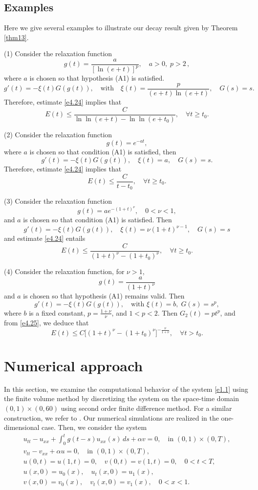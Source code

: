 \documentclass[reqno]{amsart}
\begin{document}
\subsection*{Examples}
Here we give several examples to illustrate our decay result given by Theorem \ref{thm13}.

(1)  Consider the relaxation function
\[
 g(t) = \frac{a}{[\ln(e+t)]^{p}},\quad a>0,\;p>2\, ,
\]
where $a$ is chosen so that hypothesis (A1) is satisfied.
\[
 g'(t) = -\xi(t) G(g(t)), \quad \text{with}\quad
\xi(t)=\frac{p}{(e+t)\ln(e+t)},\quad G(s) = s.
\]
Therefore, estimate \eqref{e4.24} implies that
\[
 E(t) \leq \frac{C}{\ln\ln(e+t)-\ln\ln(e+t_0)}, \quad \forall  t \geq t_0.
\]

(2) Consider the relaxation function
 \[
 g(t) = e^{-a t},
 \]
where $a$ is chosen so that condition (A1) is satisfied, then
 \[
 g'(t) = -\xi(t) G(g(t)), \quad \xi(t) = a, \quad G(s) = s.
 \]
Therefore, estimate \eqref{e4.24} implies that
\[
 E(t) \leq \frac{C}{t-t_0}, \quad \forall  t \geq t_0.
\]

(3) Consider the relaxation function
\[
 g(t) = a e^{-(1+t)^{\nu}}, \quad 0 < \nu < 1,
\]
and $a$ is chosen so that condition (A1) is satisfied. Then
 \[
 g'(t) = -\xi(t) G(g(t)), \quad \xi(t) = \nu(1+t)^{\nu - 1}, \quad G(s) = s
 \]
and estimate \eqref{e4.24} entails
\[
 E(t) \leq \frac{C}{(1+t)^\nu - (1+t_0)^\nu}, \quad \forall  t \geq t_0.
\]


(4) Consider the relaxation function, for $\nu > 1$,
\[
 g(t) = \frac{a}{(1+t)^{\nu}}
\]
and $a$ is chosen so that hypothesis (A1) remains valid. Then
\[
 g'(t)= -\xi(t) G(g(t)), \quad \text{with } \xi(t)=b,\; G(s) = s^{p},
\]
where $b$ is a fixed constant, $p = \frac{1+\nu}{\nu}$, and $1 < p < 2$.
Then $G_2(t) = p  t^p$, and from \eqref{e4.25}, we deduce that
\[
 E(t) \leq C \Big[(1+t)^{\nu}-(1+t_0)^{\nu}\Big]^{-\frac{\nu}{1+\nu}},
\quad \forall t > t_0.
 \]


\section{Numerical approach}

In this section, we examine the computational behavior of the system \eqref{e1.1}
using the finite volume method by discretizing the system on the space-time domain
$(0, 1) \times (0,60)$ using second order finite difference method. For a similar
construction, we refer to \cite{MessaoudiMostafa, GASM}.
Our numerical simulations are realized in the one-dimensional case.
Then, we consider the system
\begin{gather*}
u_{tt} - u_{xx} +\int_0^t g(t - s) u_{xx}(s) \, ds + \alpha v = 0, \quad \text{in } (0, 1) \times (0, T), \label{e5.1} \\
v_{tt} - v_{xx} + \alpha u = 0, \quad \text{in } (0, 1) \times (0, T), \label{e5.2} \\
u(0, t) = u(1, t) = 0, \quad v(0, t) = v(1, t) = 0, \quad 0 < t < T, \label{e5.3} \\
u(x, 0) = u_0(x), \quad u_t(x, 0) = u_1(x), \\
v(x, 0) = v_0(x), \quad v_t(x, 0) = v_1(x), \quad 0<x < 1. \label{e5.4}
\end{gather*}
\end{document}
